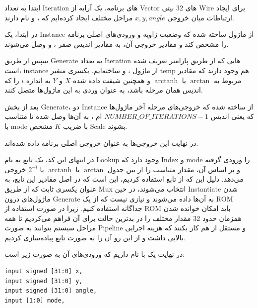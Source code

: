 \documentclass[12pt,titlepage,a4page , tikz , multi,table , svgnames,xcdraw]{article}
\DeclareMathOperator\arctanh{arctanh}
\begin{document}
ابتدا به تعداد Iteration های برنامه، یک آرایه از Vector های 32 بیتی Wire برای ایجاد ارتباطات میان خروجی $x,y,angle$ مراحل مختلف ایجاد کرده‌ایم که ،  و  نام دارند.

در ابتدا، یک Instance از ماژول  ساخته شده که وضعیت زاویه و ورودی‌های اصلی برنامه را مشخص کند و مقادیر خروجی آن، به مقادیر اندیس صفر  ،  و  وصل می‌شوند.

سپس از طریق Generate به تعداد Iteration هایی که از طریق پارامتر تعریف شده است، instance از ماژول ،  و  ساخته‌ایم. یکسری متغیر temp هم وجود دارند که مقادیر مربوط به $\arctan$ یا $\arctanh$ و همچنین شیفت داده شده $X$ و $Y$ به اندازه $i$ را که اندیس همان مرحله باشد، به عنوان وردی به این ماژول‌ها متصل کنند.

بعد از بخش Generate، دو Instance از  ساخته شده که خروجی‌های مرحله آخر ماژول‌ها که یعنی اندیس
$NUMBER\_OF\_ITERATIONS - 1$
ام
 ،
   به آن‌ها وصل شده تا متناسب با mode با ضریب $K$ مشخص Scale بشوند.

در نهایت این خروجی‌ها به عنوان خروجی اصلی برنامه داده شده‌اند.

در انتهای این کد، یک تابع به نام Lookup وجود دارد که Index و mode را ورودی گرفته و بر اساس آن، مقدار متناسب را از بین جدول $\arctan$ یا $\arctanh$ یا $2^{-i}$ خروجی می‌دهد. دلیل این که از تابع استفاده کردیم، این است که در اصل مقادیر این تابع، به عنوان یکسری ثابت که از طریق Mux انتخاب می‌شوند، در حین Instantiate شدن ماژول‌های درون Generate به آن‌ها داده می‌شوند و نیازی نیست که از یک ROM جداگانه استفاده کنیم. زیرا در صورت استفاده از ROM باید امکان خوانده شدن همزمان حدود 32 مقدار مختلف را در بدترین حالت برای آن فراهم می‌کردیم تا همه مراحل سیستم بتوانند به صورت Pipeline و مستقل از هم کار بکنند که هزینه اجرایی بالایی داشت و از این رو آن را به صورت تابع پیاده‌سازی کردیم.


\hrulefill

در نهایت یک  با نام  داریم که ورودی‌های آن به صورت زیر است:

\begin{latin}

\begin{verbatim}
input signed [31:0] x,
input signed [31:0] y,
input signed [31:0] angle,
input [1:0] mode,
   
\end{verbatim}

\end{latin}
\end{document}
